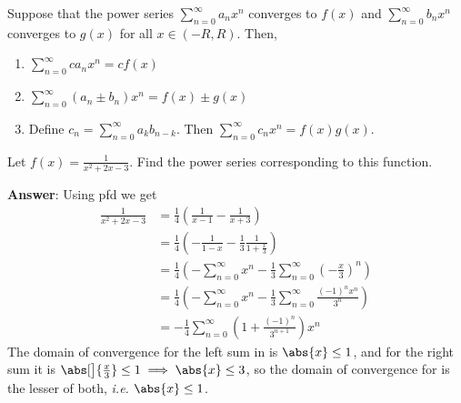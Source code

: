 \begin{thm}\label{thm-power-series-taylor-convergence-properties}
	Suppose that the power series $\sum_{n=0}^\infty a_n x^n$ converges to $f(x)$
	and $\sum_{n=0}^\infty b_n x^n$ converges to $g(x)$ for all $x\in(-R,R)$. Then,
	\begin{enumerate}
		\item $\sum\limits_{n=0}^\infty c a_n x^n=cf(x)$
		\item $\sum\limits_{n=0}^\infty (a_n \pm b_n)x^n = f(x) \pm g(x)$
		\item Define $c_n = \sum\limits_{n=0}^\infty a_k b_{n-k}$. Then $\sum\limits_{n=0}^\infty c_n x^n=f(x)g(x)$.
	\end{enumerate}
\end{thm}

\begin{exm}\label{exm-find-power-series:1}
	Let $f(x)=\tfrac{1}{x^2+2x-3}$. Find the power series corresponding to this function.
	\begin{flushleft}
		\textbf{Answer}: Using \gls{pfd} we get
		\begin{align}
			\frac{1}{x^2+2x-3}
			 & = \frac{1}{4}\left(\frac{1}{x-1}-\frac{1}{x+3}\right)\nonumber                                                                            \\
			 & = \frac{1}{4}\left(-\frac{1}{1-x}-\frac{1}{3}\frac{1}{1+\frac{x}{3}}\right)\nonumber                                                      \\
			 & = \frac{1}{4}\left(-\sum_{n=0}^\infty x^n - \frac{1}{3}\sum_{n=0}^\infty \left(-\frac{x}{3}\right)^n\right)\label{eq-find-power-series:1} \\
			 & = \frac{1}{4}\left(-\sum_{n=0}^\infty x^n - \frac{1}{3}\sum_{n=0}^\infty \frac{(-1)^n x^n}{3^n} \right)\nonumber                          \\
			 & = -\frac{1}{4}\sum_{n=0}^\infty \left(1+\frac{(-1)^n}{3^{n+1}}\right)x^n\label{eq-find-power-series:2}
		\end{align}
		The domain of convergence for the left sum in 
		is $\abs{x}\leq1$, and for the right sum it is $\abs[\big]{\tfrac{x}{3}}\leq1\implies\abs{x}\leq3$,
		so the domain of convergence for  is the lesser of both,
		\textit{i.e.} $\abs{x}\leq1$.
	\end{flushleft}
\end{exm}

